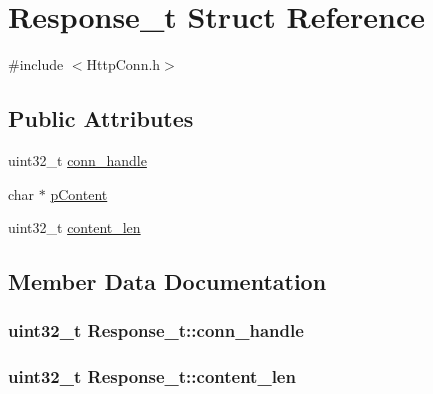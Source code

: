\hypertarget{struct_response__t}{}\section{Response\+\_\+t Struct Reference}
\label{struct_response__t}


{\ttfamily \#include $<$Http\+Conn.\+h$>$}

\subsection*{Public Attributes}
\begin{DoxyCompactItemize}
\item 
uint32\+\_\+t \hyperlink{struct_response__t_a587d2c1e2cfd637c26ea1ac99a07be83}{conn\+\_\+handle}
\item 
char $\ast$ \hyperlink{struct_response__t_add2b628b52fe71a0396dda12f45ac75c}{p\+Content}
\item 
uint32\+\_\+t \hyperlink{struct_response__t_a9be7aee1536fad62857d3fa98e95bb32}{content\+\_\+len}
\end{DoxyCompactItemize}


\subsection{Member Data Documentation}
\hypertarget{struct_response__t_a587d2c1e2cfd637c26ea1ac99a07be83}{}
\subsubsection[{conn\+\_\+handle}]{\setlength{\rightskip}{0pt plus 5cm}uint32\+\_\+t Response\+\_\+t\+::conn\+\_\+handle}\label{struct_response__t_a587d2c1e2cfd637c26ea1ac99a07be83}
\hypertarget{struct_response__t_a9be7aee1536fad62857d3fa98e95bb32}{}
\subsubsection[{content\+\_\+len}]{\setlength{\rightskip}{0pt plus 5cm}uint32\+\_\+t Response\+\_\+t\+::content\+\_\+len}\label{struct_response__t_a9be7aee1536fad62857d3fa98e95bb32}
\hypertarget{struct_response__t_add2b628b52fe71a0396dda12f45ac75c}{}
